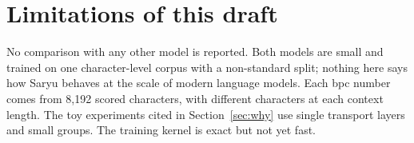 \documentclass[10pt]{article}
\begin{document}
\section{Limitations of this draft}

No comparison with any other model is reported. Both models are small and trained on one character-level
corpus with a non-standard split; nothing here says how Saryu behaves at the scale of modern language
models. Each bpc number comes from 8,192 scored characters, with different characters at each context
length. The toy experiments cited in Section~\ref{sec:why} use single transport layers and small groups.
The training kernel is exact but not yet fast.



\end{document}
